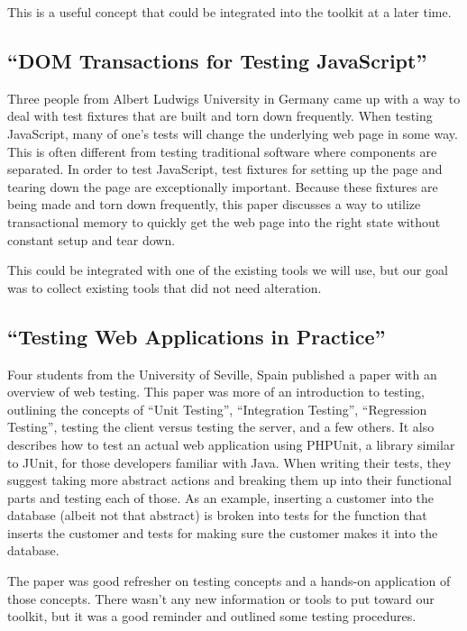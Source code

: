 \documentclass[12pt]{ucthesis}
\begin{document}
This is a useful concept that could be integrated into the toolkit at a later time.

\subsection{``DOM Transactions for Testing JavaScript''}
Three people from Albert Ludwigs University in Germany came up with a way to deal with test fixtures that are built and torn down frequently\cite{DOMTransactions}. When testing JavaScript, many of one's tests will change the underlying web page in some way. This is often different from testing traditional software where components are separated. In order to test JavaScript, test fixtures for setting up the page and tearing down the page are exceptionally important. Because these fixtures are being made and torn down frequently, this paper discusses a way to utilize transactional memory to quickly get the web page into the right state without constant setup and tear down.

This could be integrated with one of the existing tools we will use, but our goal was to collect existing tools that did not need alteration.

\subsection{``Testing Web Applications in Practice''}
Four students from the University of Seville, Spain published a paper with an overview of web testing\cite{TestingInPractice}. This paper was more of an introduction to testing, outlining the concepts of “Unit Testing”, “Integration Testing”, “Regression Testing”, testing the client versus testing the server, and a few others. It also describes how to test an actual web application using PHPUnit, a library similar to JUnit, for those developers familiar with Java. When writing their tests, they suggest taking more abstract actions and breaking them up into their functional parts and testing each of those. As an example, inserting a customer into the database (albeit not that abstract) is broken into tests for the function that inserts the customer and tests for making sure the customer makes it into the database.

The paper was good refresher on testing concepts and a hands-on application of those concepts. There wasn't any new information or tools to put toward our toolkit, but it was a good reminder and outlined some testing procedures.
\end{document}

